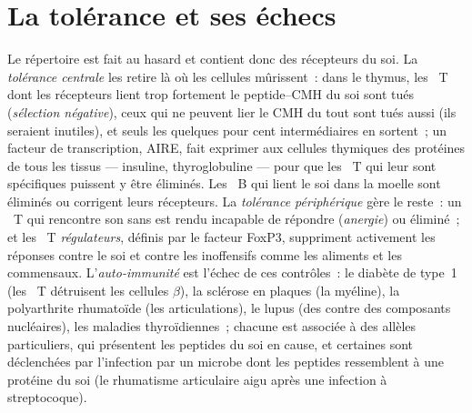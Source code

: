 \section{La tolérance et ses échecs}

\begin{definition}[La tolérance]\label{def:b3:adaptive-immunity:tolerance}
Le répertoire est fait au hasard et contient donc des récepteurs du soi.
La \emph{tolérance centrale} les retire là où les cellules mûrissent~:
dans le thymus, les ~T dont les récepteurs lient trop
fortement le peptide--CMH du soi sont tués (\emph{sélection négative}),
ceux qui ne peuvent lier le CMH du tout sont tués aussi (ils seraient
inutiles), et seuls les quelques pour cent intermédiaires en sortent~;
un facteur de transcription, AIRE, fait exprimer aux cellules thymiques
des protéines de tous les tissus --- insuline, thyroglobuline --- pour
que les ~T qui leur sont spécifiques puissent y être
éliminés. Les ~B qui lient le soi dans la moelle sont
éliminés ou corrigent leurs récepteurs. La \emph{tolérance périphérique}
gère le reste~: un ~T qui rencontre son  sans
 est rendu incapable de répondre (\emph{anergie}) ou
éliminé~; et les ~T \emph{régulateurs}, définis par le
facteur FoxP3, suppriment activement les réponses contre le soi et
contre les  inoffensifs comme les aliments et les commensaux.
L'\emph{auto-immunité} est l'échec de ces contrôles~: le diabète de
type~1 (les ~T détruisent les cellules $\beta$), la sclérose
en plaques (la myéline), la polyarthrite rhumatoïde (les articulations),
le lupus (des  contre des composants nucléaires), les maladies
thyroïdiennes~; chacune est associée à des allèles  particuliers, qui
présentent les peptides du soi en cause, et certaines sont déclenchées
par l'infection par un microbe dont les peptides ressemblent à une
protéine du soi (le rhumatisme articulaire aigu après une infection à
streptocoque).
\end{definition}

